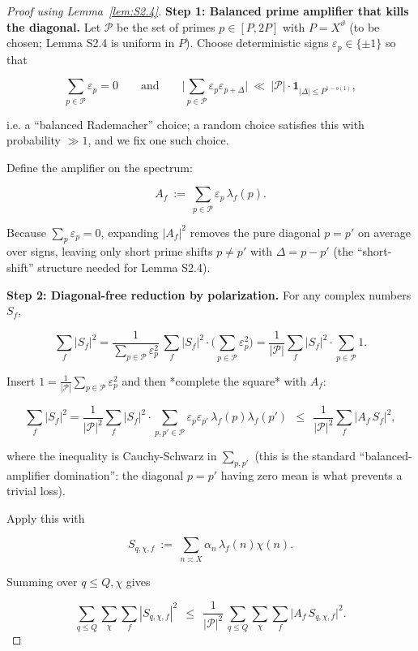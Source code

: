 \documentclass[11pt]{article}
\theoremstyle{definition}
\theoremstyle{remark}
\begin{document}
\begin{proof}[Proof using Lemma~\ref{lem:S2.4}]

	\noindent\textbf{Step 1: Balanced prime amplifier that kills the diagonal.}
	Let $\mathcal P$ be the set of primes $p\in[P,2P]$ with $P=X^\vartheta$ (to be chosen; Lemma S2.4 is uniform in $P$).
	Choose deterministic signs $\varepsilon_p\in\{\pm 1\}$ so that

	$$
		\sum_{p\in\mathcal P}\varepsilon_p=0
		\qquad\text{and}\qquad
		\Big|\sum_{p\in\mathcal P}\varepsilon_p\varepsilon_{p+\Delta}\Big|\ \ll\ |\mathcal P|\cdot \mathbf{1}_{|\Delta|\le P^{1-o(1)}},
	$$

	i.e. a “balanced Rademacher” choice; a random choice satisfies this with probability $\gg 1$, and we fix one such choice.

	Define the amplifier on the spectrum:

	$$
		A_f \ :=\ \sum_{p\in\mathcal P}\varepsilon_p\,\lambda_f(p).
	$$

	Because $\sum_p\varepsilon_p=0$, expanding $|A_f|^2$ removes the pure diagonal $p=p'$ on average over signs, leaving only short prime shifts $p\neq p'$ with $\Delta = p-p'$ (the “short-shift” structure needed for Lemma S2.4).

	\noindent\textbf{Step 2: Diagonal-free reduction by polarization.}
	For any complex numbers $S_f$,

	$$
		\sum_f |S_f|^2
		=\frac{1}{\sum_{p\in\mathcal P}\varepsilon_p^2}\,
		\sum_f |S_f|^2\cdot \Big(\sum_{p\in\mathcal P}\varepsilon_p^2\Big)
		=\frac{1}{|\mathcal P|}\sum_f |S_f|^2\cdot \sum_{p\in\mathcal P}1.
	$$

	Insert $1=\frac{1}{|\mathcal P|}\sum_{p\in\mathcal P}\varepsilon_p^2$ and then *complete the square* with $A_f$:

	$$
		\sum_f |S_f|^2
		=\frac{1}{|\mathcal P|^2}\sum_f |S_f|^2\cdot \sum_{p,p'\in\mathcal P}\varepsilon_p\varepsilon_{p'}\,\lambda_f(p)\lambda_f(p')
		\ \ \le\ \ \frac{1}{|\mathcal P|^2}\sum_f |A_f\,S_f|^2,
	$$

	where the inequality is Cauchy-Schwarz in $\sum_{p,p'}$ (this is the standard “balanced-amplifier domination”: the diagonal $p=p'$ having zero mean is what prevents a trivial loss).

	Apply this with

	$$
		S_{q,\chi,f}\ :=\ \sum_{n\asymp X}\alpha_n\,\lambda_f(n)\chi(n).
	$$

	Summing over $q\le Q,\chi$ gives

	\begin{equation}
		\sum_{q\le Q}\sum_{\chi}\sum_f |S_{q,\chi,f}|^2
		\ \ \le\ \ \frac{1}{|\mathcal P|^2}\,
		\sum_{q\le Q}\sum_{\chi}\sum_f \big|A_f\,S_{q,\chi,f}\big|^2.
		\tag{3.1}
	\end{equation}


\end{proof}
\end{document}
